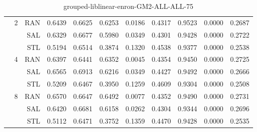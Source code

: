 \begin{center}
\begin{table}[htbp]
\begin{center}
\begin{tabular}{ | r | r | r | r | r | r | r | r | r | r | r |}
 & \multirow{3}{*}{2} & RAN & 0.6439 & 0.6625 & 0.6253 & 0.0186 & 0.4317 & 0.9523 & 0.0000 & 0.2687\\ \cline{3-11}
 &   & SAL & 0.6329 & 0.6677 & 0.5980 & 0.0349 & 0.4301 & 0.9428 & 0.0000 & 0.2722\\ \cline{3-11}
 &   & STL & 0.5194 & 0.6514 & 0.3874 & 0.1320 & 0.4538 & 0.9377 & 0.0000 & 0.2538\\ \cline{2-11}
 & \multirow{3}{*}{4} & RAN & 0.6397 & 0.6441 & 0.6352 & 0.0045 & 0.4354 & 0.9450 & 0.0000 & 0.2725\\ \cline{3-11}
 &   & SAL & 0.6565 & 0.6913 & 0.6216 & 0.0349 & 0.4427 & 0.9492 & 0.0000 & 0.2666\\ \cline{3-11}
 &   & STL & 0.5209 & 0.6467 & 0.3950 & 0.1259 & 0.4609 & 0.9304 & 0.0000 & 0.2508\\ \cline{2-11}
 & \multirow{3}{*}{8} & RAN & 0.6570 & 0.6647 & 0.6492 & 0.0077 & 0.4352 & 0.9490 & 0.0000 & 0.2731\\ \cline{3-11}
 &   & SAL & 0.6420 & 0.6681 & 0.6158 & 0.0262 & 0.4304 & 0.9344 & 0.0000 & 0.2696\\ \cline{3-11}
 &   & STL & 0.5112 & 0.6471 & 0.3752 & 0.1359 & 0.4470 & 0.9428 & 0.0000 & 0.2535\\ \cline{2-11}
\hline
\end{tabular}
\caption{grouped-liblinear-enron-GM2-ALL-ALL-75}
\end{center}
 \end{table}
\end{center}


